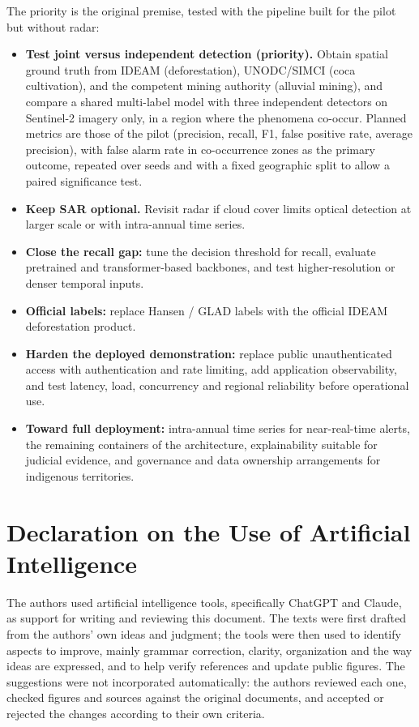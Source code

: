 \documentclass{article}
\begin{document}
The priority is the original premise, tested with the pipeline built for the
pilot but without radar:

\begin{itemize}
    \item \textbf{Test joint versus independent detection (priority).}
    Obtain spatial ground truth from IDEAM (deforestation), UNODC/SIMCI (coca
    cultivation), and the competent mining authority (alluvial mining), and
    compare a shared multi-label model with three independent detectors on
    Sentinel-2 imagery only, in a region where the phenomena co-occur.
    Planned metrics are those of the pilot (precision, recall, F1, false
    positive rate, average precision), with false alarm rate in co-occurrence
    zones as the primary outcome, repeated over seeds and with a fixed
    geographic split to allow a paired significance test.
    \item \textbf{Keep SAR optional.} Revisit radar if cloud cover limits
    optical detection at larger scale or with intra-annual time series.
    \item \textbf{Close the recall gap:} tune the decision threshold for
    recall, evaluate pretrained and transformer-based backbones, and test
    higher-resolution or denser temporal inputs.
    \item \textbf{Official labels:} replace Hansen / GLAD labels with the
    official IDEAM deforestation product.
    \item \textbf{Harden the deployed demonstration:} replace public unauthenticated access with authentication and rate limiting, add application observability, and test latency, load, concurrency and regional reliability before operational use.
    \item \textbf{Toward full deployment:} intra-annual time series for
    near-real-time alerts, the remaining containers of the architecture,
    explainability suitable for judicial evidence, and governance and data
    ownership arrangements for indigenous territories.
\end{itemize}


\section*{Declaration on the Use of Artificial Intelligence}
The authors used artificial intelligence tools, specifically ChatGPT and Claude, as support for writing and reviewing this document. The texts were first drafted from the authors' own ideas and judgment; the tools were then used to identify aspects to improve, mainly grammar correction, clarity, organization and the way ideas are expressed, and to help verify references and update public figures. The suggestions were not incorporated automatically: the authors reviewed each one, checked figures and sources against the original documents, and accepted or rejected the changes according to their own criteria.
\end{document}

